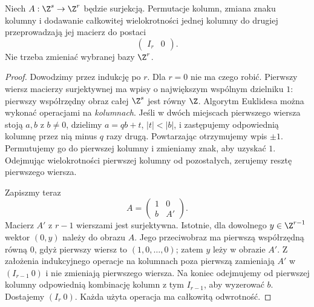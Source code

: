 \begin{lemat}
\label{lem:macierz-surj-hc-19}
Niech $A:\Z^s\to\Z^r$
będzie surjekcją.
Permutacje kolumn, zmiana
znaku kolumny i dodawanie
całkowitej wielokrotności
jednej kolumny do drugiej
przeprowadzają jej macierz
do postaci
\[
       \begin{pmatrix}I_r&0\end{pmatrix}.
\]
Nie trzeba zmieniać
wybranej bazy $\Z^r$.
\end{lemat}
\begin{proof}
Dowodzimy przez indukcję po $r$.
Dla $r=0$ nie ma czego robić.
Pierwszy wiersz macierzy
surjektywnej ma wpisy
o największym wspólnym
dzielniku $1$: pierwszy
współrzędny obraz całej
$\Z^s$ jest równy $\Z$.
Algorytm Euklidesa można
wykonać operacjami na
\emph{kolumnach}.
Jeśli w dwóch miejscach
pierwszego wiersza stoją
$a,b$ z $b\ne0$, dzielimy
$a=qb+t$, $|t|<|b|$,
i zastępujemy odpowiednią
kolumnę przez nią minus
$q$ razy drugą. Powtarzając
otrzymujemy wpis $\pm1$.
Permutujemy go do pierwszej
kolumny i zmieniamy znak,
aby uzyskać $1$.
Odejmując wielokrotności
pierwszej kolumny od
pozostałych, zerujemy
resztę pierwszego wiersza.

Zapiszmy teraz
\[
 A=\begin{pmatrix}
       1&0\\
       b&A'
    \end{pmatrix}.
\]
Macierz $A'$ z $r-1$
wierszami jest surjektywna.
Istotnie, dla dowolnego
$y\in\Z^{r-1}$ wektor
$(0,y)$ należy do obrazu $A$.
Jego przeciwobraz ma
pierwszą współrzędną
równą $0$, gdyż pierwszy
wiersz to $(1,0,\ldots,0)$;
zatem $y$ leży w obrazie
$A'$. Z założenia
indukcyjnego operacje
na kolumnach poza pierwszą
zamieniają $A'$ w
$(I_{r-1}\ 0)$ i nie
zmieniają pierwszego wiersza.
Na koniec odejmujemy
od pierwszej kolumny
odpowiednią kombinację
kolumn z tym $I_{r-1}$,
aby wyzerować $b$.
Dostajemy $(I_r\ 0)$.
Każda użyta operacja
ma całkowitą odwrotność.
\end{proof}

